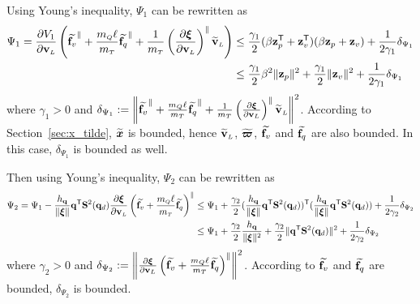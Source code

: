 \documentclass[journal,onecolumn]{IEEEtran}
\begin{document}
Using Young's inequality, $\Psi_1$ can be rewritten as
% 
\begin{equation}
	\begin{aligned}
	\Psi_1=\frac{\partial V_1}{\partial \vL}\LP\widetilde{\f_v}^{\|} + \frac{\mQ\ellp}{\mT}\widetilde{\f_q}^{\|} + \frac{1}{\mT}\LP\frac{\partial\Xiq}{\partial\vL}\RP^{\|}\vLtilde\RP&\leq \frac{\gamma_1}{2}(\beta\zp[T]+\zv[T])(\beta\zp+\zv) + \frac{1}{2\gamma_1}\delta_{\Psi_1}\\
	&\leq \frac{\gamma_1}{2} \beta^2\|\zp\|^2 +\frac{\gamma_1}{2}\|\zv\|^2 + \frac{1}{2\gamma_1}\delta_{\Psi_1}
    \end{aligned}
\end{equation}
%
where $\gamma_1>0$ and $\delta_{\Psi_1}:=\left\|\widetilde{\f_v}^{\|} + \frac{\mQ\ellp}{\mT}\widetilde{\f_q}^{\|} + \frac{1}{\mT}\LP\frac{\partial\Xiq}{\partial\vL}\RP^{\|}\vLtilde\right\|^2$. 
According to Section~\ref{sec:x_tilde}, $\widetilde{\boldsymbol{x}}$ is bounded, hence $\vLtilde$, $\widetilde{\boldsymbol{\varpi}}$, $\widetilde{\f_v}$ and $\widetilde{\f_q}$ are also bounded. 
In this case, $\delta_{\Psi_1}$ is bounded as well.

Then using Young's inequality, $\Psi_2$ can be rewritten as
%
\begin{equation}
	\begin{aligned}
		\Psi_2=\Psi_1 - \frac{h_\v{q}}{\|\Xiq\|}\dir[T]\Skew[2]{\dird}  \frac{\partial \Xiq}{\partial \vL}\LP\widetilde{\f_v} 
		+ \frac{\mQ\ellp}{\mT}\widetilde{\f_q} \RP^{\|}&\leq \Psi_1 + \frac{\gamma_2}{2}(\frac{h_\v{q}}{\|\Xiq\|}\dir[T]\Skew[2]{\dird})\trs
		(\frac{h_\v{q}}{\|\Xiq\|}\dir[T]\Skew[2]{\dird}) + \frac{1}{2\gamma_2}\delta_{\Psi_2}\\
		&\leq \Psi_1 + \frac{\gamma_2}{2} \frac{h_\v{q}}{\|\Xiq\|^2} +\frac{\gamma_2}{2}\|\dir[T]\Skew[2]{\dird}\|^2 + \frac{1}{2\gamma_2}\delta_{\Psi_2}
	\end{aligned}
\end{equation}
% 
where $\gamma_2>0$ and $\delta_{\Psi_2}:=\left\|\frac{\partial \Xiq}{\partial \vL}\LP\widetilde{\f_v} 
+ \frac{\mQ\ellp}{\mT}\widetilde{\f_q} \RP^{\|}\right\|^2$. 
According to $\widetilde{\f_v}$ and $\widetilde{\f_q}$ are bounded, $\delta_{\Psi_2}$ is bounded.
\end{document}
